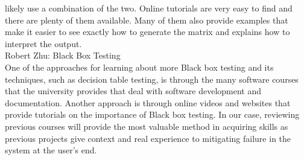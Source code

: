 \documentclass[12pt]{article}
\begin{document}
\begin{outline}[enumerate]
likely use a combination of the two. Online tutorials are very easy to find and there are plenty of them available. Many of them also provide examples that make it 
easier to see exactly how to generate the matrix and explains how to interpret the output.\\
    \2 Robert Zhu: Black Box Testing\\
    One of the approaches for learning about more Black box testing and its techniques, such as decision table testing, is through the many software courses that the university 
    provides that deal with software development and documentation. Another approach is through online videos and websites that provide tutorials on the importance of Black box testing. 
    In our case, reviewing previous courses will provide the most valuable method in acquiring skills as previous projects give context and real experience to mitigating failure in 
    the system at the user’s end.\\

  
\end{outline}
\end{document}
